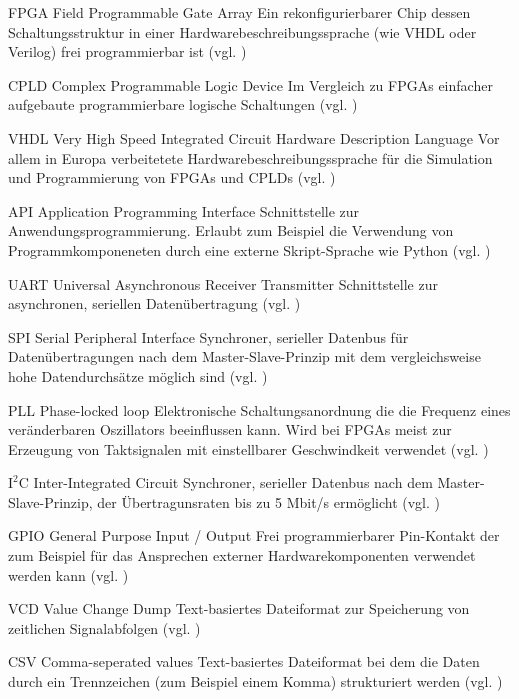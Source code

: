
	{FPGA}
	{Field Programmable Gate Array}
	{Ein rekonfigurierbarer Chip dessen Schaltungsstruktur in einer Hardwarebeschreibungssprache (wie VHDL oder Verilog) frei programmierbar ist (vgl. \cite{wiki:FPGA})} 

	{CPLD}
	{Complex Programmable Logic Device}
	{Im Vergleich zu FPGAs einfacher aufgebaute programmierbare logische Schaltungen (vgl. \cite{wiki:CPLD})}

	{VHDL}
	{Very High Speed Integrated Circuit Hardware Description Language}
	{Vor allem in Europa verbeitetete Hardwarebeschreibungssprache für die Simulation und Programmierung von FPGAs und CPLDs (vgl. \cite{wiki:VHDL})}


	{API}
	{Application Programming Interface}
	{Schnittstelle zur Anwendungsprogrammierung. Erlaubt zum Beispiel die Verwendung von Programmkomponeneten durch eine externe Skript-Sprache wie Python (vgl. \cite{wiki:API})}

	{UART}
	{Universal Asynchronous Receiver Transmitter}
	{Schnittstelle zur asynchronen, seriellen Datenübertragung (vgl. \cite{wiki:UART})}


	{SPI}
	{Serial Peripheral Interface}
	{Synchroner, serieller Datenbus für Datenübertragungen nach dem Master-Slave-Prinzip mit dem vergleichsweise hohe Datendurchsätze möglich sind (vgl. \cite{wiki:SPI})}


	{PLL}
	{Phase-locked loop}
	{Elektronische Schaltungsanordnung die die Frequenz eines veränderbaren Oszillators beeinflussen kann. Wird bei FPGAs meist zur Erzeugung von Taktsignalen mit einstellbarer Geschwindkeit verwendet (vgl. \cite{wiki:PLL})}

	{$\text{I}^2$C}
	{Inter-Integrated Circuit}
	{Synchroner, serieller Datenbus nach dem Master-Slave-Prinzip, der Übertragunsraten bis zu 5 Mbit/s ermöglicht (vgl. \cite{wiki:I2C})}

	{GPIO}
	{General Purpose Input / Output}
	{Frei programmierbarer Pin-Kontakt der zum Beispiel für das Ansprechen externer Hardwarekomponenten verwendet werden kann (vgl. \cite{wiki:GPIO})}


	{VCD}
	{Value Change Dump}
	{Text-basiertes Dateiformat zur Speicherung von zeitlichen Signalabfolgen  (vgl. \cite{wiki:VCD})}

	{CSV}
	{Comma-seperated values}
	{Text-basiertes Dateiformat bei dem die Daten durch ein Trennzeichen (zum Beispiel einem Komma) strukturiert werden (vgl. \cite{wiki:CSV})}


